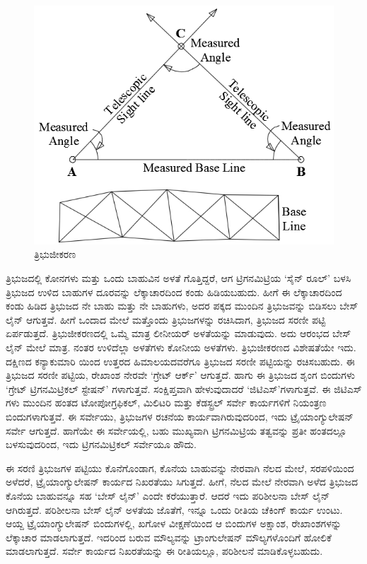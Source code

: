 \begin{figure}[!htbp]
\includegraphics[scale=.75]{"images/image003.jpg"}
\caption{ತ್ರಿಭುಜೀಕರಣ}\label{chap3-fig01}
\end{figure}

ತ್ರಿಭುಜದಲ್ಲಿ  ಕೋನಗಳು ಮತ್ತು ಒಂದು ಬಾಹುವಿನ ಅಳತೆ ಗೊತ್ತಿದ್ದರೆ, ಆಗ ಟ್ರಿಗನಮಿಟ್ರಿಯ ‘ಸೈನ್​ ರೂಲ್​’ ಬಳಸಿ ತ್ರಿಭುಜದ ಉಳಿದ  ಬಾಹುಗಳ ದೂರವನ್ನು ಲೆಕ್ಕಾಚಾರದಿಂದ ಕಂಡು ಹಿಡಿಯಬಹುದು. ಹೀಗೆ ಈ ಲೆಕ್ಕಾಚಾರದಿಂದ ಕಂಡು ಹಿಡಿದ ತ್ರಿಭುಜದ ನೇ ಬಾಹು ಮತ್ತು ನೇ ಬಾಹುಗಳು, ಅದರ ಪಕ್ಕದ ಮುಂದಿನ ತ್ರಿಭುಜವನ್ನು ಬಿಡಿಸಲು ಬೇಸ್​ ಲೈನ್​ ಆಗುತ್ತವೆ. ಹೀಗೆ ಒಂದಾದ ಮೇಲೆ ಮತ್ತೊಂದು ತ್ರಿಭುಜಗಳನ್ನು ರಚಿಸಿದಾಗ, ತ್ರಿಭುಜದ ಸರಣೀ ಪಟ್ಟಿ ಏರ್ಪಡುತ್ತದೆ. ತ್ರಿಭುಜೀಕರಣದಲ್ಲಿ ಒಮ್ಮೆ ಮಾತ್ರ ಲೀನೀಯರ್​ ಅಳತೆಯನ್ನು ಮಾಡುವುದು. ಅದು ಆರಂಭದ ಬೇಸ್​ ಲೈನ್​ ಮೇಲೆ ಮಾತ್ರ. ನಂತರ ಉಳಿದೆಲ್ಲಾ ಅಳತೆಗಳು ಕೋನೀಯ ಅಳತೆಗಳು. ತ್ರಿಭುಜೀಕರಣದ ವಿಶೇಷತೆಯೇ ಇದು. ದಕ್ಷಿಣದ ಕನ್ಯಾಕುಮಾರಿ ಯಿಂದ ಉತ್ತರದ ಹಿಮಾಲಯದವರೆಗೂ ತ್ರಿಭುಜದ ಸರಣೀ ಪಟ್ಟಿಯನ್ನು ರಚಿಸಬಹುದು. ಈ ತ್ರಿಭುಜದ ಸರಣೀ ಪಟ್ಟಿಯ, ರೇಖಾಂಶ ನೇರವೇ ‘ಗ್ರೇಟ್​ ಆರ್ಕ್’ ಆಗುತ್ತದೆ. ಹಾಗು ಈ ತ್ರಿಭುಜದ ಶೃಂಗ ಬಿಂದುಗಳು ‘ಗ್ರೇಟ್​ ಟ್ರಿಗನಮಿಟ್ರಿಕಲ್​ ಸ್ಟೇಷನ್​’ ಗಳಾಗುತ್ತವೆ. ಸಂಕ್ಷಿಪ್ತವಾಗಿ ಹೇಳುವುದಾದರೆ ‘ಜಿಟಿಎಸ್​’ಗಳಾಗುತ್ತವೆ. ಈ ಜಿಟಿಎಸ್​ಗಳು ಮುಂದಿನ ಹಂತದ ಟೋಪೋಗ್ರಫಿಕಲ್​, ಮಿಲಿಟರಿ ಮತ್ತು ಕೆಡಸ್ಟ್ರಲ್​ ಸರ್ವೇ ಕಾರ್ಯಗಳಿಗೆ ನಿಯಂತ್ರಣ ಬಿಂದುಗಳಾಗುತ್ತವೆ. ಈ ಸರ್ವೇಯು, ತ್ರಿಭುಜಗಳ ರಚನೆಯ ಕಾರ್ಯವಾಗಿರುವುದರಿಂದ, ಇದು ಟ್ರೈಯಾಂಗ್ಯುಲೇಷನ್​ ಸರ್ವೇ ಆಗುತ್ತದೆ. ಹಾಗೆಯೇ ಈ ಸರ್ವೇಯಲ್ಲಿ, ಬಹು ಮುಖ್ಯವಾಗಿ ಟ್ರಿಗನಮಿಟ್ರಿಯ ತತ್ವವನ್ನು ಪ್ರತೀ ಹಂತದಲ್ಲೂ ಬಳಸುವುದರಿಂದ, ಇದು ಟ್ರಿಗನಮಿಟ್ರಿಕಲ್​ ಸರ್ವೇಯೂ ಹೌದು.

\newpage

ಈ ಸರಣಿ ತ್ರಿಭುಜಗಳ ಪಟ್ಟಿಯು ಕೊನೆಗೊಂಡಾಗ, ಕೊನೆಯ ಬಾಹುವನ್ನು ನೇರವಾಗಿ ನೆಲದ ಮೇಲೆ, ಸರಪಳಿಯಿಂದ ಅಳೆದರೆ, ಟ್ರೈಯಾಂಗ್ಯುಲೇಷನ್​ ಕಾರ್ಯದ ನಿಖರತೆಯು ಸಿಗುತ್ತದೆ. ಹೀಗೆ, ನೆಲದ ಮೇಲೆ ನೇರವಾಗಿ ಅಳೆದ ತ್ರಿಭುಜದ ಕೊನೆಯ ಬಾಹುವನ್ನೂ ಸಹ ‘ಬೇಸ್​ ಲೈನ್​’ ಎಂದೇ ಕರೆಯುತ್ತಾರೆ. ಆದರೆ ಇದು ಪರಿಶೀಲನಾ ಬೇಸ್​ ಲೈನ್​ ಆಗಿರುತ್ತದೆ. ಪರಿಶೀಲನಾ ಬೇಸ್​ ಲೈನ್​ ಅಳತೆಯ ಜೊತೆಗೆ, ಇನ್ನೂ ಒಂದು ರೀತಿಯ ಚೆಕಿಂಗ್​ ಕಾರ್ಯ ಉಂಟು. ಆಯ್ದ ಟ್ರೈಯಾಂಗ್ಯುಲೇಷನ್​ ಬಿಂದುಗಳಲ್ಲಿ, ಖಗೋಳ ವೀಕ್ಷಣೆಯಿಂದ ಆ ಬಿಂದುಗಳ ಅಕ್ಷಾಂಶ, ರೇಖಾಂಶಗಳನ್ನು ಲೆಕ್ಕಾಚಾರ ಮಾಡಲಾಗುತ್ತದೆ. ಇದರಿಂದ ಬರುವ ಮೌಲ್ಯವನ್ನು ಟ್ರಾಂಗುಲೇಷನ್​ ಮೌಲ್ಯಗಳೊಂದಿಗೆ ಹೋಲಿಕೆ ಮಾಡಲಾಗುತ್ತದೆ. ಸರ್ವೇ ಕಾರ್ಯದ ನಿಖರತೆಯನ್ನು ಈ ರೀತಿಯಲ್ಲೂ, ಪರಿಶೀಲನೆ ಮಾಡಿಕೊಳ್ಳಬಹುದು.

